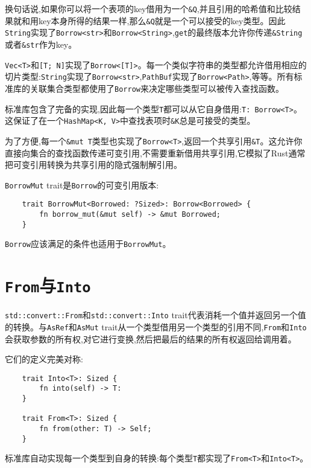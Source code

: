 换句话说,如果你可以将一个表项的key借用为一个\texttt{\&Q},并且引用的哈希值和比较结果就和用key本身所得的结果一样,那么\texttt{\&Q}就是一个可以接受的key类型。因此\texttt{String}实现了\texttt{Borrow<str>}和\texttt{Borrow<String>},\texttt{get}的最终版本允许你传递\texttt{\&String}或者\texttt{\&str}作为key。

\texttt{Vec<T>}和\texttt{[T; N]}实现了\texttt{Borrow<[T]>}。每一个类似字符串的类型都允许借用相应的切片类型:\texttt{String}实现了\texttt{Borrow<str>},\texttt{PathBuf}实现了\texttt{Borrow<Path>},等等。所有标准库的关联集合类型都使用了\texttt{Borrow}来决定哪些类型可以被传入查找函数。

标准库包含了完备的实现,因此每一个类型\texttt{T}都可以从它自身借用:\texttt{T: Borrow<T>}。这保证了在一个\texttt{HashMap<K, V>}中查找表项时\texttt{\&K}总是可接受的类型。

为了方便,每一个\texttt{\&mut T}类型也实现了\texttt{Borrow<T>},返回一个共享引用\texttt{\&T}。这允许你直接向集合的查找函数传递可变引用,不需要重新借用共享引用,它模拟了Rust通常把可变引用转换为共享引用的隐式强制解引用。

\texttt{BorrowMut} trait是\texttt{Borrow}的可变引用版本:
\begin{verbatim}
    trait BorrowMut<Borrowed: ?Sized>: Borrow<Borrowed> {
        fn borrow_mut(&mut self) -> &mut Borrowed;
    }
\end{verbatim}

\texttt{Borrow}应该满足的条件也适用于\texttt{BorrowMut}。

\section{\texttt{From}与\texttt{Into}}\label{from}

\texttt{std::convert::From}和\texttt{std::convert::Into} trait代表消耗一个值并返回另一个值的转换。与\texttt{AsRef}和\texttt{AsMut} trait从一个类型借用另一个类型的引用不同,\texttt{From}和\texttt{Into}会获取参数的所有权,对它进行变换,然后把最后的结果的所有权返回给调用着。

它们的定义完美对称:
\begin{verbatim}
    trait Into<T>: Sized {
        fn into(self) -> T:
    }

    trait From<T>: Sized {
        fn from(other: T) -> Self;
    }
\end{verbatim}

标准库自动实现每一个类型到自身的转换:每个类型\texttt{T}都实现了\texttt{From<T>}和\texttt{Into<T>}。

